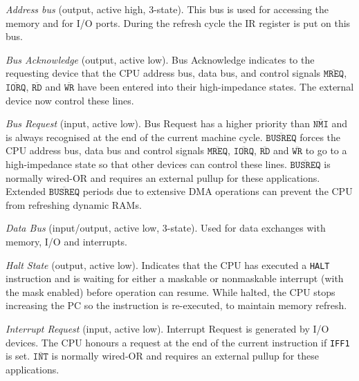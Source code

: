 \begin{description}[leftmargin=1.5em]

	\item[$\mathtt{A_{15}-A_0}$] 
	{\em Address bus} (output, active high, 3-state). This bus is used for accessing the memory and for I/O ports. During the refresh cycle the IR register is put on this bus.

	\item[$\mathtt{\overline{BUSACK}}$]
	{\em Bus Acknowledge} (output, active low). Bus Acknowledge indicates to the requesting device that the CPU address bus, data bus, and control signals $\mathtt{\overline{MREQ}}$, $\mathtt{\overline{IORQ}}$, $\mathtt{\overline{RD}}$ and $\mathtt{\overline{WR}}$ have been entered into their high-impedance states. The external device now control these lines.

	\item[$\mathtt{\overline{BUSREQ}}$]
	{\em Bus Request} (input, active low). Bus Request has a higher priority than $\mathtt{\overline{NMI}}$ and is always recognised at the end of the current machine cycle. $\mathtt{\overline{BUSREQ}}$ forces the CPU address bus, data bus and control signals $\mathtt{\overline{MREQ}}$, $\mathtt{\overline{IORQ}}$, $\mathtt{\overline{RD}}$ and $\mathtt{\overline{WR}}$ to go to a high-impedance state so that other devices can control these lines. $\mathtt{\overline{BUSREQ}}$ is normally wired-OR and requires an external pullup for these applications. Extended $\mathtt{\overline{BUSREQ}}$ periods due to extensive DMA operations can prevent the CPU from refreshing dynamic RAMs.

	\item[$\mathtt{D_7-D_0}$]
	{\em Data Bus} (input/output, active low, 3-state). Used for data exchanges with memory, I/O and interrupts.

	\item[$\mathtt{\overline{HALT}}$]
	{\em Halt State} (output, active low). Indicates that the CPU has executed a {\tt HALT} instruction and is waiting for either a maskable or nonmaskable interrupt (with the mask enabled) before operation can resume. While halted, the CPU stops increasing the PC so the instruction is re-executed, to maintain memory refresh.

	\item[$\mathtt{\overline{INT}}$]
	{\em Interrupt Request} (input, active low). Interrupt Request is generated by I/O devices. The CPU honours a request at the end of the current instruction if {\tt IFF1} is set. $\mathtt{\overline{INT}}$ is normally wired-OR and requires an external pullup for these applications.


\end{description}
